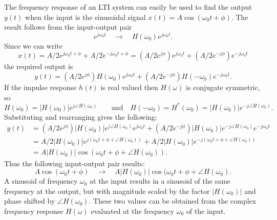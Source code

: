 \documentclass[10pt]{beamer}
\begin{document}
The frequency response of an LTI system can easily be used to find the output $y(t)$ when the input is the sinusoidal signal $x(t) = A \cos(\omega_0 t + \phi)$.  The result follows from the input-output pair
\begin{equation*}
  e^{j \omega_0 t} \quad \longrightarrow \quad H(\omega_0) e^{j \omega_0 t}.
\end{equation*}
Since we can write
\begin{equation*}
  x(t) = A/2 e^{j \omega_0 t + \phi} + A/2 e^{-j \omega_0 t + \phi} 
  = (A/2 e^{j \phi}) e^{j \omega_0 t} + (A/2 e^{-j \phi}) e^{-j \omega_0 t} 
\end{equation*}
the required output is
\begin{equation*}
  y(t) = (A/2 e^{j \phi}) H(\omega_0) e^{j \omega_0 t} + (A/2 e^{-j \phi}) H(-\omega_0) e^{-j \omega_0 t}.
\end{equation*}
If the impulse response $h(t)$ is real valued then $H(\omega)$ is conjugate symmetric, so
\begin{equation*}
  H(\omega_0) = |H(\omega_0)| e^{j \angle H(\omega_0)} \qquad \text{and} \quad
  H(-\omega_0) = H^\ast(\omega_0) = |H(\omega_0)| e^{-j \angle H(\omega_0)}.
\end{equation*}
Substituting and rearranging gives the following:
\begin{align*}
  y(t) &=  (A/2 e^{j \phi}) |H(\omega_0)| e^{j \angle H(\omega_0)} e^{j \omega_0 t} 
  + (A/2 e^{-j \phi}) |H(\omega_0)| e^{-j \angle H(\omega_0)} e^{-j \omega_0 t} \\
  &= A/2 |H(\omega_0)| e^{j (\omega_0 t + \phi + \angle H(\omega_0))} +
  A/2 |H(\omega_0)| e^{-j (\omega_0 t + \phi + \angle H(\omega_0))} \\
  &= A |H(\omega_0)| \cos(\omega_0 t + \phi + \angle H(\omega_0)).
\end{align*}
Thus the following input-output pair results:
\begin{equation*}
  A \cos(\omega_0 t + \phi) \quad \longrightarrow \quad A |H(\omega_0)| \cos(\omega_0 t + \phi + \angle H(\omega_0).
\end{equation*}
A sinusoid of frequency $\omega_0$ at the input results in a sinusoid of the same frequency at the output, but with magnitude scaled by the factor $|H(\omega_0)|$ and phase shifted by $\angle H(\omega_0)$.  These two values can be obtained from the complex frequency response $H(\omega)$ evaluated at the frequency $\omega_0$ of the input.
\end{document}
